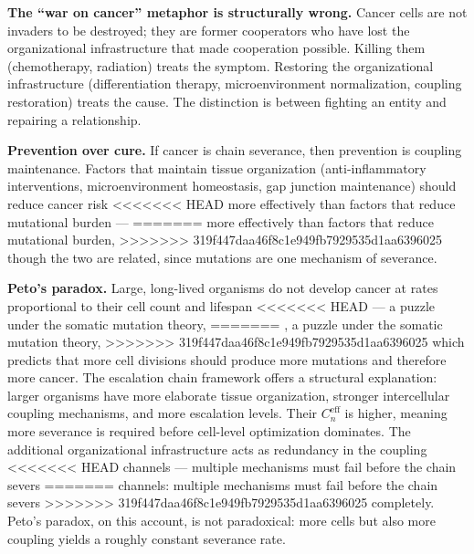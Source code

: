 \documentclass[11pt]{article}
\theoremstyle{definition}
\theoremstyle{remark}
\begin{document}
\textbf{The ``war on cancer'' metaphor is structurally wrong.} Cancer
cells are not invaders to be destroyed; they are former cooperators
who have lost the organizational infrastructure that made cooperation
possible. Killing them (chemotherapy, radiation) treats the symptom.
Restoring the organizational infrastructure (differentiation therapy,
microenvironment normalization, coupling restoration) treats the
cause. The distinction is between fighting an entity and repairing a
relationship.

\textbf{Prevention over cure.} If cancer is chain severance, then
prevention is coupling maintenance. Factors that maintain tissue
organization (anti-inflammatory interventions, microenvironment
homeostasis, gap junction maintenance) should reduce cancer risk
<<<<<<< HEAD
more effectively than factors that reduce mutational burden ---
=======
more effectively than factors that reduce mutational burden,
>>>>>>> 319f447daa46f8c1e949fb7929535d1aa6396025
though the two are related, since mutations are one mechanism of
severance.

\textbf{Peto's paradox.} Large, long-lived organisms do not develop
cancer at rates proportional to their cell count and lifespan
<<<<<<< HEAD
\cite{Peto1975} --- a puzzle under the somatic mutation theory,
=======
\cite{Peto1975}, a puzzle under the somatic mutation theory,
>>>>>>> 319f447daa46f8c1e949fb7929535d1aa6396025
which predicts that more cell divisions should produce more
mutations and therefore more cancer. The escalation chain framework
offers a structural explanation: larger organisms have more
elaborate tissue organization, stronger intercellular coupling
mechanisms, and more escalation levels. Their
$C_n^{\mathrm{eff}}$ is higher, meaning more severance is required
before cell-level optimization dominates. The additional
organizational infrastructure acts as redundancy in the coupling
<<<<<<< HEAD
channels --- multiple mechanisms must fail before the chain severs
=======
channels: multiple mechanisms must fail before the chain severs
>>>>>>> 319f447daa46f8c1e949fb7929535d1aa6396025
completely. Peto's paradox, on this account, is not paradoxical:
more cells but also more coupling yields a roughly constant
severance rate.
\end{document}
